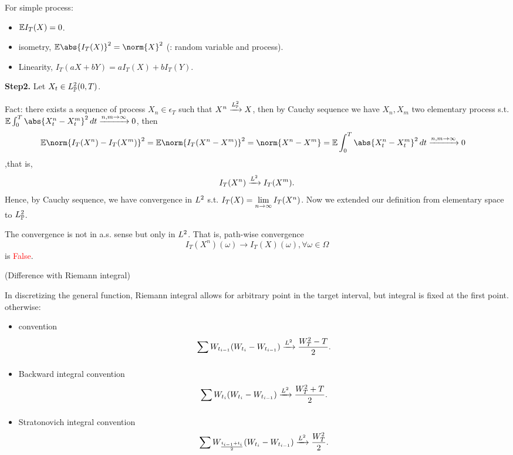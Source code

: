\begin{lem}For simple process:
\begin{itemize}
    \item $\mathbb{E} I_T(X) = 0$.
    \item \ito isometry, $\E\abs{I_T(X)}^2 = \norm{X}^2$ (: random variable and process).
    \item Linearity, $I_T(aX+bY) = aI_T(X) + bI_T(Y)$.
\end{itemize}
\end{lem}
\textbf{Step2.} Let $X_t\in L_{\mathbb{P}}^{2}(0,T)$.

Fact: there exists a sequence of process $X_n\in \epsilon_T$ such that $X^n \xrightarrow{L_{\mathbb{P}}^{2} }X$, then by Cauchy sequence we have $X_n, X_m$ two elementary process s.t. $\E\int_0^T \abs{X_t^n - X_t^m}^2 \diff t \xrightarrow{n,m\rightarrow \infty} 0$, then
\begin{align*}
    \E\norm{I_T(X^n) - I_T(X^m)}^2 &= \E\norm{I_T(X^n- X^m)}^2 = \norm{X^n- X^m} = \E\int_0^T \abs{X_t^n - X_t^m}^2 \diff t \xrightarrow{n,m\rightarrow \infty} 0 
\end{align*} ,that is,
\begin{equation*}
     I_T(X^n) \xrightarrow{L^{2}} I_T(X^m).
\end{equation*}
Hence, by Cauchy sequence, we have convergence in $L^{2}$ s.t. $I_T(X) = \lim\limits_{n\rightarrow \infty} I_T(X^n)$. Now we extended our definition from elementary space to $L_{\mathbb{P}}^{2}$.

\begin{rem}
The convergence is not in a.s. sense but only in $L^{2}$. That is, path-wise convergence
\begin{equation*}
    I_T(X^n)(\omega) \rightarrow I_T(X)(\omega), \forall \omega \in \Omega
\end{equation*} is \textcolor{red}{False}.
\end{rem}

\begin{rem}{(Difference with Riemann integral)}

In discretizing the general function, Riemann integral allows for arbitrary point in the target interval, but \ito integral is fixed at the first point. otherwise:
\begin{itemize}
    \item{\ito convention} 
    \begin{equation*}
        \sum\limits_{} W_{t_{i-1}}(W_{t_{i}}-W_{t_{i-1}}) \xrightarrow{L^{2}} \frac{W_T^2 - T}{2}.
    \end{equation*}
    \item{Backward \ito integral convention}
    \begin{equation*}
        \sum\limits_{} W_{t_{i}}(W_{t_{i}}-W_{t_{i-1}}) \xrightarrow{L^{2}} \frac{W_T^2 + T}{2}.
    \end{equation*} 
    \item{Stratonovich integral convention}
    \begin{equation*}
        \sum\limits_{} W_{\frac{t_{i-1}+t_i}{2}}(W_{t_{i}}-W_{t_{i-1}}) \xrightarrow{L^{2}} \frac{W_T^2}{2}.
    \end{equation*} 
\end{itemize}
\end{rem}

